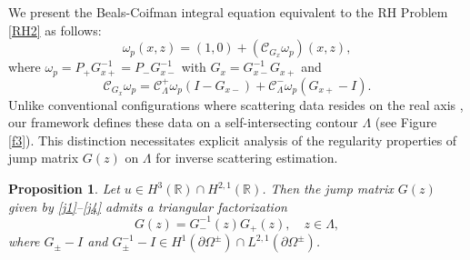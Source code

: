\documentclass[preprint,compress,12pt]{elsarticle}
\newtheorem{proposition}[theorem]{Proposition}
\numberwithin{equation}{section}
\begin{document}
We present the Beals-Coifman integral equation equivalent to the RH Problem \ref{RH2} as follows:
\begin{equation}\label{nu}
\omega_{p}(x,z)=(1,0)+\left(\mathcal{C}_{G_{x}}\omega_{p}\right)(x,z),
\end{equation}
where $\omega_{p}=P_{+}G_{x+}^{-1}=P_{-}G_{x-}^{-1}$ with $G_{x}=G_{x-}^{-1}G_{x+}$  and
\begin{equation}
\mathcal{C}_{G_{x}}\omega_{p}=\mathcal{C}_{\Lambda}^{+}\omega_{p}(I-G_{x-})+\mathcal{C}_{\Lambda}^{-}\omega_{p}(G_{x+}-I).
\end{equation}
Unlike conventional configurations where scattering data resides on the real axis \cite{Chengglo}, our framework defines these data on a self-intersecting contour $\Lambda$ (see Figure \ref{f3}). This distinction necessitates explicit analysis of the regularity properties of jump matrix $G(z)$ on $\Lambda$ for inverse scattering estimation.
\begin{proposition}\label{vuyf}
Let $u\in H^{3}(\mathbb{R})\cap H^{2,1}(\mathbb{R})$. Then the jump matrix $G(z)$ given by \eqref{j1}--\eqref{j4} admits a triangular factorization
\begin{equation}
G(z)=G_{-}^{-1}(z)G_{+}(z), \quad z\in\Lambda,
\end{equation}
where
$G_{\pm}-I$ and $G_{\pm}^{-1}-I\in H^{1}(\partial\Omega^{\pm})\cap L^{2,1}(\partial\Omega^{\pm})$.
\end{proposition}
\end{document}
